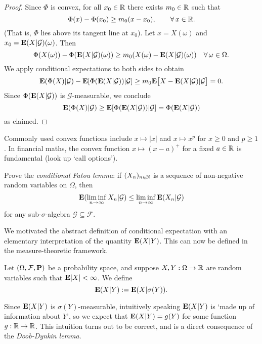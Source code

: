 \begin{proof}
    Since $\Phi$ is convex, for all $x_0\in\mathbb{R}$ there exists $m_0\in\mathbb{R}$ such that
    \begin{equation*}
        \Phi(x)-\Phi(x_0) \ge m_0(x-x_0), \qquad\forall\, x\in\mathbb{R}.
    \end{equation*}
    (That is, $\Phi$ lies above its tangent line at $x_0$). Let $x=X(\omega)$ and $x_0=\mathbf{E}(X|\mathcal{G})(\omega)$. Then
    \begin{equation*}
        \Phi(X(\omega))-\Phi(\mathbf{E}(X|\mathcal{G})(\omega)) \ge m_0(X(\omega)-\mathbf{E}(X|\mathcal{G})(\omega)) \quad\forall\,\omega\in\Omega.
    \end{equation*}
    We apply conditional expectations to both sides to obtain
    \begin{equation*}
        \mathbf{E}(\Phi(X)|\mathcal{G}) - \mathbf{E}[\Phi(\mathbf{E}(X|\mathcal{G}))|\mathcal{G}] \ge m_0\mathbf{E}\big[X-\mathbf{E}(X|\mathcal{G})|\mathcal{G}\big] = 0.
    \end{equation*}
    Since $\Phi(\mathbf{E}(X|\mathcal{G}))$ is $\mathcal{G}$-measurable, we conclude
    \begin{equation*}
        \mathbf{E}(\Phi(X)|\mathcal{G}) \ge \mathbf{E}[\Phi(\mathbf{E}(X|\mathcal{G}))|\mathcal{G}] = \Phi(\mathbf{E}(X|\mathcal{G}))
    \end{equation*}
    as claimed.
\end{proof}

\begin{example}
    Commonly used convex functions include $x\mapsto |x|$ and $x\mapsto x^p$ for $x\ge 0$ and $p\ge 1$. In financial maths, the convex function $x\mapsto (x-a)^+$ for a fixed $a\in\mathbb{R}$ is fundamental (look up `call options').
\end{example}

\begin{exercise}
    Prove the \emph{conditional Fatou lemma}: if $(X_n)_{n\in\mathbb{N}}$ is a sequence of non-negative random variables on $\Omega$, then
    \begin{equation}
        \mathbf{E}(\liminf_{n\to\infty}X_n|\mathcal{G}) \le \liminf_{n\to\infty}\mathbf{E}(X_n|\mathcal{G})
    \end{equation}
    for any sub-$\sigma$-algebra $\mathcal{G}\subseteq\mathcal{F}$.
\end{exercise}

We motivated the abstract definition of conditional expectation with an elementary interpretation of the quantity $\mathbf{E}(X|Y)$. This can now be defined in the measure-theoretic framework.
\begin{definition}
    Let $(\Omega,\mathcal{F},\mathbf{P})$ be a probability space, and suppose $X,Y:\Omega\to\mathbb{R}$ are random variables such that $\mathbf{E}|X|<\infty$. We define
    \begin{equation}
        \mathbf{E}(X|Y) := \mathbf{E}(X|\sigma(Y)).
    \end{equation}
\end{definition}
Since $\mathbf{E}(X|Y)$ is $\sigma(Y)$-measurable, intuitively speaking $\mathbf{E}(X|Y)$ is `made up of information about $Y$', so we expect that $\mathbf{E}(X|Y)=g(Y)$ for some function $g:\mathbb{R}\to\mathbb{R}$. This intuition turns out to be correct, and is a direct consequence of the \emph{Doob-Dynkin lemma}.

